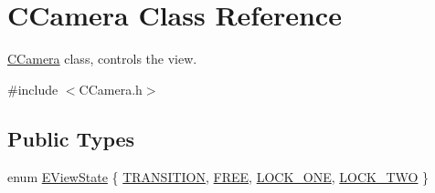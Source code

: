 \hypertarget{class_c_camera}{}\section{C\+Camera Class Reference}
\label{class_c_camera}


\mbox{\hyperlink{class_c_camera}{C\+Camera}} class, controls the view.  




{\ttfamily \#include $<$C\+Camera.\+h$>$}

\subsection*{Public Types}
\begin{DoxyCompactItemize}
\item 
enum \mbox{\hyperlink{class_c_camera_ae03c923f302a1ff2a7f85044b7352229}{E\+View\+State}} \{ \mbox{\hyperlink{class_c_camera_ae03c923f302a1ff2a7f85044b7352229a32633cd46c45e3e2c25e9831710aa08e}{T\+R\+A\+N\+S\+I\+T\+I\+ON}}, 
\mbox{\hyperlink{class_c_camera_ae03c923f302a1ff2a7f85044b7352229a69f9afb475e63cea958e95a599137068}{F\+R\+EE}}, 
\mbox{\hyperlink{class_c_camera_ae03c923f302a1ff2a7f85044b7352229ac76c288d800a888a8278325d16ee11f5}{L\+O\+C\+K\+\_\+\+O\+NE}}, 
\mbox{\hyperlink{class_c_camera_ae03c923f302a1ff2a7f85044b7352229a68b92d539034c7cbe151d1b90db4a2cc}{L\+O\+C\+K\+\_\+\+T\+WO}}
 \}
\end{DoxyCompactItemize}
